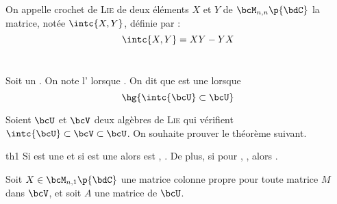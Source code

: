 \documentclass[a4paper,french,bookmarks]{article}
\begin{document}
    On appelle crochet de \textsc{Lie} de deux éléments $X$ et $Y$ de $\bcM_{n, n}\p{\bdC}$ la matrice, notée $\intc{X, Y}$, définie par :
    \[ \intc{X, Y} = XY - YX\]
    \text{}\\[-25pt]
    \begin{definition}{}{}
        Soit \hg{$\bcU$} un . On note \hg{$\intc{\bcU}$} l' lorsque . On dit que \hg{$\bcU$} est une  lorsque
        \[ \hg{\intc{\bcU} \subset \bcU} \]
    \end{definition}
    Soient $\bcU$ et $\bcV$ deux algèbres de \textsc{Lie} qui vérifient $\intc{\bcU} \subset \bcV \subset \bcU$. On souhaite prouver le théorème suivant.
    \begin{theorem}{}{th1}
        Si  est une  et si  est une  alors  est , . De plus, si pour , , alors .
    \end{theorem}
    Soit $X \in \bcM_{n, 1}\p{\bdC}$ une matrice colonne propre pour toute matrice $M$ dans $\bcV$, et soit $A$ une matrice de $\bcU$.
    
\end{document}
